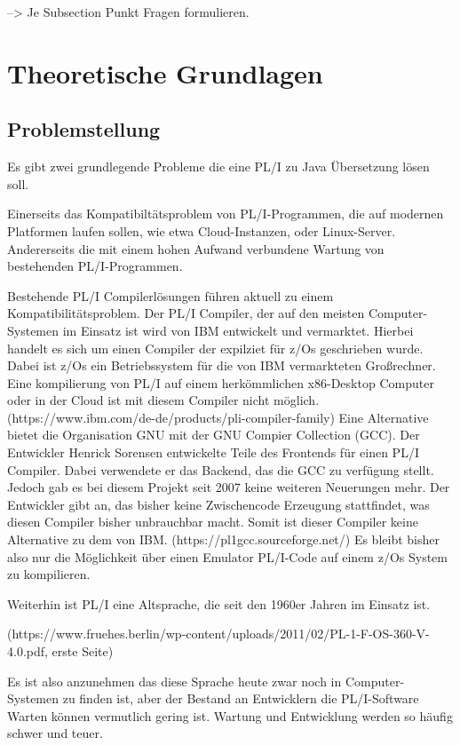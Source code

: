 --> Je Subsection Punkt Fragen formulieren.

\section{Theoretische Grundlagen}
	\subsection{Problemstellung}
	
	Es gibt zwei grundlegende Probleme die eine PL/I zu Java Übersetzung lösen soll. 
	
	Einerseits das Kompatibiltätsproblem von PL/I-Programmen, die auf modernen Platformen laufen sollen, wie etwa Cloud-Instanzen, oder Linux-Server. Andererseits die mit einem hohen Aufwand verbundene Wartung von bestehenden PL/I-Programmen. 
	
	Bestehende PL/I Compilerlösungen führen aktuell zu einem Kompatibilitätsproblem. Der PL/I Compiler, der auf den meisten Computer-Systemen im Einsatz ist wird von IBM entwickelt und vermarktet. Hierbei handelt es sich um einen Compiler der expilziet für z/Os geschrieben wurde. Dabei ist z/Os ein Betriebssystem für die von IBM vermarkteten Großrechner. Eine kompilierung von PL/I auf einem herkömmlichen x86-Desktop Computer oder in der Cloud ist mit diesem Compiler nicht möglich. 
	(https://www.ibm.com/de-de/products/pli-compiler-family) 
	Eine Alternative bietet die Organisation GNU mit der GNU Compier Collection (GCC). Der Entwickler Henrick Sorensen entwickelte Teile des Frontends für einen PL/I Compiler. Dabei verwendete er das Backend, das die GCC zu verfügung stellt. Jedoch gab es bei diesem Projekt seit 2007 keine weiteren Neuerungen mehr. Der Entwickler gibt an, das bisher keine Zwischencode Erzeugung stattfindet, was diesen Compiler bisher unbrauchbar macht. Somit ist dieser Compiler keine Alternative zu dem von IBM.
	(https://pl1gcc.sourceforge.net/) 
Es bleibt bisher also nur die Möglichkeit über einen Emulator PL/I-Code auf einem z/Os System zu kompilieren.

Weiterhin ist PL/I eine Altsprache, die seit den 1960er Jahren im Einsatz ist. 

(https://www.fruehes.berlin/wp-content/uploads/2011/02/PL-1-F-OS-360-V-4.0.pdf, erste Seite) 

Es ist also anzunehmen das diese Sprache heute zwar noch in Computer-Systemen zu finden ist, aber der Bestand an Entwicklern die PL/I-Software Warten können vermutlich gering ist. Wartung und Entwicklung werden so häufig schwer und teuer.

